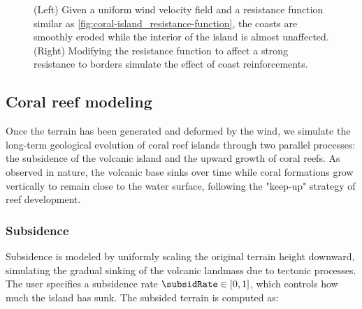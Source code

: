\documentclass{egpubl}
\begin{document}
\begin{figure}
    \caption{(Left) Given a uniform wind velocity field and a resistance function similar as \cref{fig:coral-island_resistance-function}, the coasts are smoothly eroded while the interior of the island is almost unaffected. (Right) Modifying the resistance function to affect a strong resistance to borders simulate the effect of coast reinforcements.}
    \label{fig:coral-island_resistance-result}
\end{figure}




\subsection{Coral reef modeling}
\label{sec:coral-island_coral-reef}

Once the terrain has been generated and deformed by the wind, we simulate the long-term geological evolution of coral reef islands through two parallel processes: the subsidence of the volcanic island and the upward growth of coral reefs. As observed in nature, the volcanic base sinks over time while coral formations grow vertically to remain close to the water surface, following the "keep-up" strategy of reef development.

\subsubsection{Subsidence}
\label{sec:coral-island_subsidence}

Subsidence is modeled by uniformly scaling the original terrain height downward, simulating the gradual sinking of the volcanic landmass due to tectonic processes. The user specifies a subsidence rate $\subsidRate \in [0, 1]$, which controls how much the island has sunk. The subsided terrain is computed as:
\end{document}
